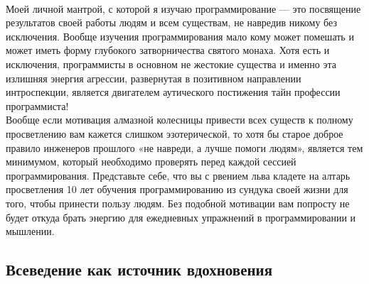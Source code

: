 \\
Моей личной мантрой, с которой я изучаю программирование — это посвящение результатов своей работы людям и всем существам, не навредив никому без исключения. Вообще изучения программирования мало кому может помешать и может иметь форму глубокого затворничества святого монаха. Хотя есть и исключения, программисты в основном не жестокие существа и именно эта излишняя энергия агрессии, развернутая в позитивном направлении интроспекции, является двигателем аутического постижения тайн профессии программиста!
\\
Вообще если мотивация алмазной колесницы привести всех существ к полному просветлению вам кажется слишком эзотерической, то хотя бы старое доброе правило инженеров прошлого «не навреди, а лучше помоги людям», является тем минимумом, который необходимо проверять перед каждой сессией программирования. Представьте себе, что вы с рвением льва кладете на алтарь просветления 10 лет обучения программированию из сундука своей жизни для того, чтобы принести пользу людям. Без подобной мотивации вам попросту не будет откуда брать энергию для ежедневных упражнений в программировании и мышлении.

\subsection{Всеведение как источник вдохновения}

